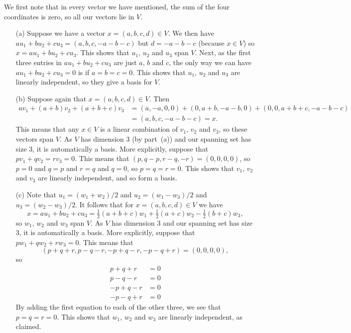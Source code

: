 \documentclass[a4paper]{amsart}
\newcommand{\half}      {{\tfrac{1}{2}}}
\renewcommand{\:}{\colon}
\theoremstyle{definition}
\newenvironment{solution}{{\noindent \bf Solution:}}{}
\begin{document}
\begin{solution}
 We first note that in every vector we have mentioned, the sum of
 the four coordinates is zero, so all our vectors lie in $V$.
 \begin{itemize}
  \item[(a)] Suppose we have a vector $x=(a,b,c,d)\in V$.  We then
  have $au_1+bu_2+cu_3=(a,b,c,-a-b-c)$ but $d=-a-b-c$ (because
  $x\in V$) so $x=au_1+bu_2+cu_3$.  This shows that $u_1$, $u_2$
  and $u_3$ span $V$.  Next, as the first three entries in
  $au_1+bu_2+cu_3$ are just $a$, $b$ and $c$, the only way we can
  have $au_1+bu_2+cu_3=0$ is if $a=b=c=0$.  This shows that $u_1$,
  $u_2$ and $u_3$ are linearly independent, so they give a basis
  for $V$.
  \item[(b)] Suppose again that $x=(a,b,c,d)\in V$.  Then
   \begin{align*}
    a v_1 + (a+b) v_2 + (a+b+c) v_3 &=
      (a,-a,0,0) + (0,a+b,-a-b,0) + (0,0,a+b+c,-a-b-c) \\
      &= (a,b,c,-a-b-c) = x.
   \end{align*}
   This means that any $x\in V$ is a linear combination of $v_1$,
   $v_2$ and $v_3$, so these vectors span $V$.  As $V$ has
   dimension $3$ (by part~(a)) and our spanning set has size $3$,
   it is automatically a basis. More explicitly, suppose that
   $pv_1+qv_2=rv_3=0$.  This means that
   $(p,q-p,r-q,-r)=(0,0,0,0)$, so $p=0$ and $q=p$ and $r=q$ and
   $q=0$, so $p=q=r=0$.  This shows that $v_1$, $v_2$ and $v_3$
   are linearly independent, and so form a basis.
  \item[(c)] Note that $u_1=(w_1+w_2)/2$ and $u_2=(w_1-w_3)/2$ and
  $u_3=(w_2-w_3)/2$.  It follows that for $x=(a,b,c,d)\in V$ we
  have
   \[ x = au_1+bu_2+cu_3 =
       \half(a+b+c)w_1 + \half(a+c)w_2 - \half(b+c)w_3,
   \]
   so $w_1$, $w_2$ and $w_3$ span $V$.  As $V$ has dimension $3$
   and our spanning set has size $3$, it is automatically a basis.
   More explicitly, suppose that $pw_1+qw_2+rw_3=0$.  This means
   that
   \[ (p+q+r,p-q-r,-p+q-r,-p-q+r)=(0,0,0,0), \]
   so
   \begin{align*}
     p+q+r &= 0 \\
     p-q-r &= 0 \\
    -p+q-r &= 0 \\
    -p-q+r &= 0
   \end{align*}
   By adding the first equation to each of the other three, we see
   that $p=q=r=0$.  This shows that $w_1$, $w_2$ and $w_3$ are
   linearly independent, as claimed.
 \end{itemize}
\end{solution}
\end{document}
